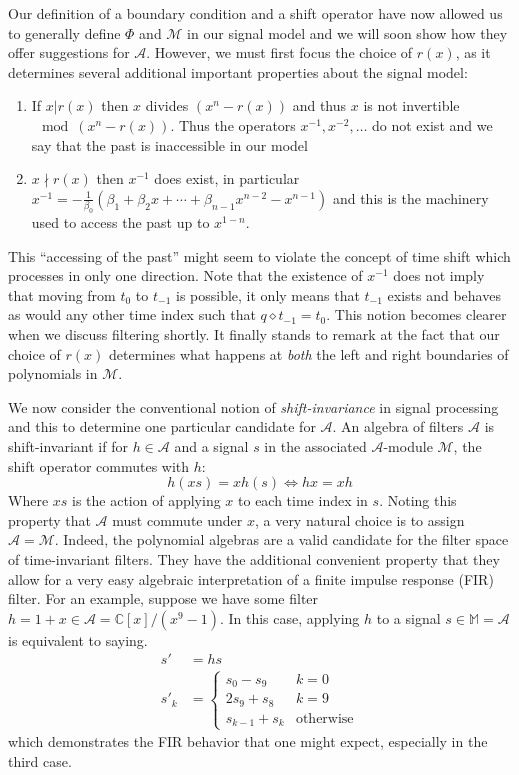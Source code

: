 \documentclass[12pt,technote]{IEEEtran}
\begin{document}
Our definition of a boundary condition and a shift operator have now allowed us to generally define $\Phi$ and $\mathcal{M}$ in our signal model and we will soon show how they offer suggestions for $\mathcal{A}$. However, we must first focus the choice of $r(x)$, as it determines several additional important properties about the signal model:
\begin{enumerate}
    \item If $x|r(x)$ then $x$ divides $(x^n - r(x))$ and thus $x$ is not invertible $\mod{(x^n - r(x))}$. Thus the operators $x^{-1}, x^{-2}, \dots$ do not exist and we say that the past is inaccessible in our model
    \item $x\nmid r(x)$ then $x^{-1}$ does exist, in particular $x^{-1} = -\frac{1}{\beta_0}(\beta_1 + \beta_2x + \cdots +\beta_{n-1}x^{n-2} - x^{n-1})$ and this is the machinery used to access the past up to $x^{1-n}$.
\end{enumerate}
This ``accessing of the past'' might seem to violate the concept of time shift which processes in only one direction. Note that the existence of $x^{-1}$ does not imply that moving from $t_0$ to $t_{-1}$ is possible, it only means that $t_{-1}$ exists and behaves as would any other time index such that $q\diamond t_{-1} = t_0$. This notion becomes clearer when we discuss filtering shortly. It finally stands to remark at the fact that our choice of $r(x)$ determines what happens at \textit{both} the left and right boundaries of polynomials in $\mathcal{M}$.

We now consider the conventional notion of \textit{shift-invariance} in signal processing and this to determine one particular candidate for $\mathcal{A}$. An algebra of filters $\mathcal{A}$ is shift-invariant if for $h\in \mathcal{A}$ and a signal $s$ in the associated $\mathcal{A}$-module $\mathcal{M}$, the shift operator commutes with $h$:
\begin{equation*}
    h(xs) = xh(s) \iff hx = xh
\end{equation*}
Where $xs$ is the action of applying $x$ to each time index in $s$. Noting this property that $\mathcal{A}$ must commute under $x$, a very natural choice is to assign $\mathcal{A} = \mathcal{M}$. Indeed, the polynomial algebras are a valid candidate for the filter space of time-invariant filters. They have the additional convenient property that they allow for a very easy algebraic interpretation of a finite impulse response (FIR) filter. For an example, suppose we have some filter $h = 1 + x\in \mathcal{A} = \mathbb{C}[x]/(x^{9} - 1)$. In this case, applying $h$ to a signal $s\in \mathbb{M} = \mathcal{A}$ is equivalent to saying.
\begin{align*}
    s' &= hs\\
    s'_k &= \begin{cases}
        s_0 - s_9 & k = 0\\
        2s_9 + s_8 & k = 9\\
        s_{k-1} + s_k & \text{otherwise}       
    \end{cases}
\end{align*}
which demonstrates the FIR behavior that one might expect, especially in the third case.
\end{document}
